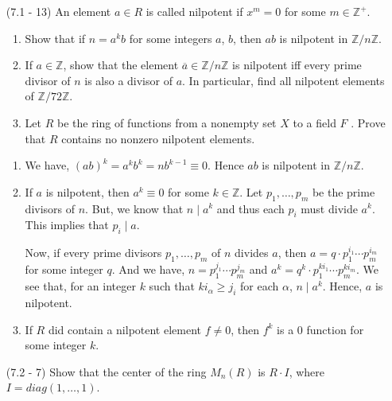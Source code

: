 \documentclass[12pt]{article}
\newcommand{\bz}{\mathbb{Z}}
\newcommand{\mz}{\mathbb{Z}}
\begin{document}
\begin{enumerate}
\item[(7.1 - 13)] An element $a\in R$ is called
    nilpotent if $x^m = 0$ for some $m \in\mathbb{Z}^+$.
    \begin{enumerate}
        \item Show that if $n = a^kb$ for some integers
        $a$, $b$, then $ab$ is nilpotent in $\bz/n\bz$.

        \item If $a\in\bz$, show that the element
        $\overline{a}\in\bz/n\bz$ is nilpotent
        iff every prime divisor of $n$ is
        also a divisor
        of $a$. In particular, find all nilpotent elements
        of $\bz/72\bz$.

        \item Let $R$ be the ring of functions from a
        nonempty set $X$ to a field $F$ . Prove that $R$
        contains no nonzero nilpotent elements.
    \end{enumerate}
\begin{mybox}

    \begin{enumerate}
        \item We have, $(ab)^k=a^kb^k=nb^{k-1}\equiv 0$.
        Hence $ab$ is nilpotent in $\mz/n\mz$.
        \item If $a$ is nilpotent, then $a^k\equiv 0$
        for some $k\in\mz$. Let $p_1,\ldots,p_m$ be the
        prime divisors of $n$. But,
        we know that $n\mid a^k$ and thus each $p_i$ must
        divide $a^k$. This implies that $p_i\mid a$.

        \vspace*{2mm}
        Now, if every prime divisors $p_1,\ldots,p_m$ of
        $n$ divides $a$, then $a=q\cdot p_1^{i_1}\cdots 
        p_m^{i_m}$ for some integer $q$. And we have,
        $n=p_1^{j_1}\cdots 
        p_m^{j_m}$ and $a^k=q^k\cdot p_1^{ki_1}\cdots 
        p_m^{ki_m}$. We see that, for an integer $k$ such
        that $ki_\alpha\geq j_i$ for each $\alpha$,
        $n\mid a^k$. Hence, $a$ is nilpotent.

        \item If $R$ did contain a nilpotent element
        $f\neq 0$, then $f^k$ is a 0 function for some
        integer $k$.
    \end{enumerate}
\end{mybox}

\item[(7.2 - 7)] Show that the center of the ring $M_n(R)$
    is $R\cdot I$, where $I = diag(1,\ldots,1)$.
\begin{mybox}
    

\end{mybox}
\end{enumerate}
\end{document}
